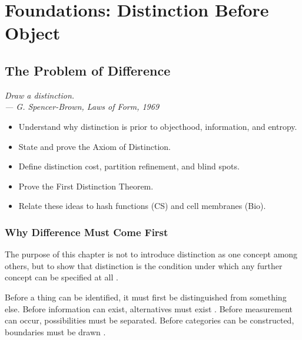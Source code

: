 \documentclass[12pt,twoside,openright]{book}
\newenvironment{epigraph}[2]{%
  \vspace{1em}\begin{flushright}
  \begin{minipage}{0.72\textwidth}
  \itshape\small #1\\[0.4em]
  \upshape\footnotesize\sffamily\color{DistGray}--- #2
  \end{minipage}\end{flushright}\vspace{1.5em}}{}
\newenvironment{objectives}{%
  \begin{tcolorbox}[colback=DistBlue!5,colframe=DistBlue,
    title={\faCheckCircle\enspace Learning Objectives},
    fonttitle=\sffamily\bfseries\color{white},
    attach boxed title to top left={yshift=-2mm,xshift=4mm},
    boxed title style={colback=DistBlue},breakable]
  \begin{itemize}[leftmargin=*,nosep]}{%
  \end{itemize}\end{tcolorbox}\vspace{1em}}
\begin{document}
\part{Foundations: Distinction Before Object}


\chapter{The Problem of Difference}
\label{ch:distinction}

\begin{epigraph}{Draw a distinction.}%
  {G. Spencer-Brown, \textit{Laws of Form}, 1969
  \parencite{spencer-brown1969}}
\end{epigraph}

\begin{objectives}
  \item Understand why distinction is prior to objecthood,
        information, and entropy.
  \item State and prove the Axiom of Distinction.
  \item Define distinction cost, partition refinement, and
        blind spots.
  \item Prove the First Distinction Theorem.
  \item Relate these ideas to hash functions (CS) and
        cell membranes (Bio).
\end{objectives}

\section{Why Difference Must Come First}
\label{sec:ch1-priority}

The purpose of this chapter is not to introduce distinction
as one concept among others, but to show that distinction
is the condition under which any further concept can be
specified at all \parencite{spencer-brown1969}.

Before a thing can be identified, it must first be
distinguished from something else. Before information can
exist, alternatives must exist \parencite{bateson1972}.
Before measurement can occur, possibilities must be
separated. Before categories can be constructed, boundaries
must be drawn \parencite{luhmann1984}.
\end{document}
